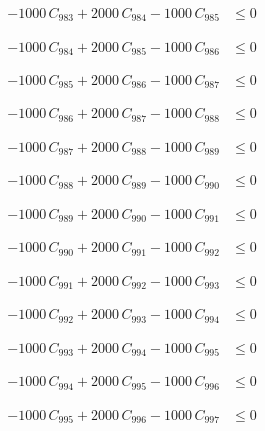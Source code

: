 \documentclass[a4paper,11pt]{article}
\begin{document}
\begin{align}
-1000\,C_{983} + 2000\,C_{984} - 1000\,C_{985} &\leq 0 \nonumber
\end{align}

\begin{align}
-1000\,C_{984} + 2000\,C_{985} - 1000\,C_{986} &\leq 0 \nonumber
\end{align}

\begin{align}
-1000\,C_{985} + 2000\,C_{986} - 1000\,C_{987} &\leq 0 \nonumber
\end{align}

\begin{align}
-1000\,C_{986} + 2000\,C_{987} - 1000\,C_{988} &\leq 0 \nonumber
\end{align}

\begin{align}
-1000\,C_{987} + 2000\,C_{988} - 1000\,C_{989} &\leq 0 \nonumber
\end{align}

\begin{align}
-1000\,C_{988} + 2000\,C_{989} - 1000\,C_{990} &\leq 0 \nonumber
\end{align}

\begin{align}
-1000\,C_{989} + 2000\,C_{990} - 1000\,C_{991} &\leq 0 \nonumber
\end{align}

\begin{align}
-1000\,C_{990} + 2000\,C_{991} - 1000\,C_{992} &\leq 0 \nonumber
\end{align}

\begin{align}
-1000\,C_{991} + 2000\,C_{992} - 1000\,C_{993} &\leq 0 \nonumber
\end{align}

\begin{align}
-1000\,C_{992} + 2000\,C_{993} - 1000\,C_{994} &\leq 0 \nonumber
\end{align}

\begin{align}
-1000\,C_{993} + 2000\,C_{994} - 1000\,C_{995} &\leq 0 \nonumber
\end{align}

\begin{align}
-1000\,C_{994} + 2000\,C_{995} - 1000\,C_{996} &\leq 0 \nonumber
\end{align}

\begin{align}
-1000\,C_{995} + 2000\,C_{996} - 1000\,C_{997} &\leq 0 \nonumber
\end{align}
\end{document}
